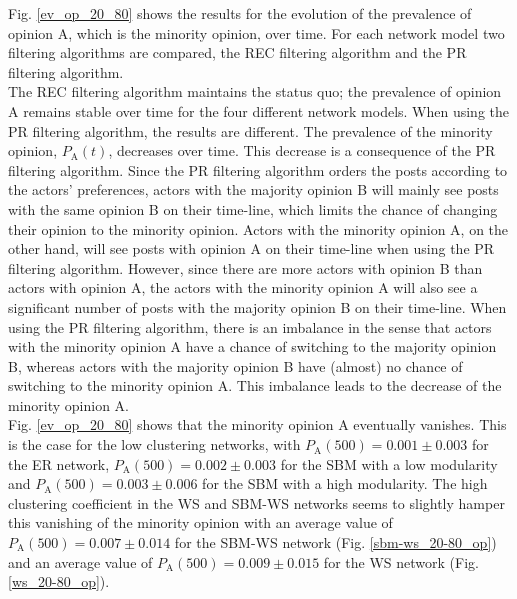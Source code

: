 \documentclass[11 pt , letterpaper , twoside , openright]{book}
\begin{document}
\newline
Fig. \ref{ev_op_20_80} shows the results for the evolution of the prevalence of opinion A, which is the minority opinion, over time. For each network model two filtering algorithms are compared, the REC filtering algorithm and the PR filtering algorithm. \\
\newline
The REC filtering algorithm maintains the status quo; the prevalence of opinion A remains stable over time for the four different network models. When using the PR filtering algorithm, the results are different. The prevalence of the minority opinion, $P_\text{A}(t)$, decreases over time. This decrease is a consequence of the PR filtering algorithm. Since the PR filtering algorithm orders the posts according to the actors' preferences, actors with the majority opinion B will mainly see posts with the same opinion B on their time-line, which limits the chance of changing their opinion to the minority opinion. Actors with the minority opinion A, on the other hand, will see posts with opinion A on their time-line when using the PR filtering algorithm. However, since there are more actors with opinion B than actors with opinion A, the actors with the minority opinion A will also see a significant number of posts with the majority opinion B on their time-line. When using the PR filtering algorithm, there is an imbalance in the sense that actors with the minority opinion A have a chance of switching to the majority opinion B, whereas actors with the majority opinion B have (almost) no chance of switching to the minority opinion A. This imbalance leads to the decrease of the minority opinion A.\\
\newline
Fig. \ref{ev_op_20_80} shows that the minority opinion A eventually vanishes. This is the case for the low clustering networks, with $P_\text{A}(500) = 0.001 \pm 0.003$ for the ER network, $P_\text{A}(500) = 0.002 \pm 0.003$ for the SBM with a low modularity and $P_\text{A}(500) = 0.003 \pm 0.006$ for the SBM with a high modularity. The high clustering coefficient in the WS and SBM-WS networks seems to slightly hamper this vanishing of the minority opinion with an average value of $P_\text{A}(500) = 0.007 \pm 0.014$ for the SBM-WS network (Fig. \ref{sbm-ws_20-80_op}) and an average value of $P_\text{A}(500) = 0.009 \pm 0.015$ for the WS network (Fig. \ref{ws_20-80_op}).\\ 
\newline
\end{document}
